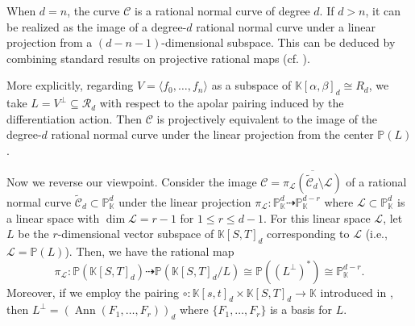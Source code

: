 \documentclass[a4paper, 11pt]{amsart}
\numberwithin{theorem}{section}
\theoremstyle{definition}
\numberwithin{equation}{section}
\DeclareMathOperator{\Ann}{\operatorname{Ann}}
\begin{document}
When $d = n$, the curve $\mathcal{C}$ is a rational normal curve of degree $d$. 
If $d > n$, it can be realized as the image of a degree-$d$ rational normal curve under a linear projection from a $(d-n-1)$-dimensional subspace. 
This can be deduced by combining standard results on projective rational maps (cf. \cite[Section 2]{MR3592466}).

More explicitly, regarding $V=\langle f_0,\dots,f_n\rangle$ as a subspace of $\mathbb{K}[\alpha,\beta]_d\cong R_d$, we take $L=V^\perp\subseteq\mathcal{R}_d$ with respect to the apolar pairing induced by the differentiation action.
Then $\mathcal{C}$ is projectively equivalent to the image of the degree-$d$ rational normal curve under the linear projection from the center $\mathbb{P}(L)$.

Now we reverse our viewpoint. 
Consider the image $\mathcal{C} = \overline{\pi_{\mathcal{L}}(\widetilde{\mathcal{C}}_d \setminus \mathcal{L})}$ of a rational normal curve $\widetilde{\mathcal{C}}_d \subset \mathbb{P}_{\mathbb{K}}^d$ under the linear projection $\pi_{\mathcal{L}} : \mathbb{P}_{\mathbb{K}}^d \dashrightarrow \mathbb{P}_{\mathbb{K}}^{d-r}$ where $\mathcal{L} \subset \mathbb{P}_{\mathbb{K}}^d$ is a linear space with $\dim \mathcal{L} = r-1$ for $1\leq r \leq d-1$. 
For this linear space $\mathcal{L}$, let $L$ be the $r$-dimensional vector subspace of $\mathbb{K}[S,T]_d$ corresponding to $\mathcal{L}$ (i.e., $\mathcal{L} = \mathbb{P}(L)$). 
Then, we have the rational map
\[
\pi_{\mathcal{L}} : \mathbb{P}(\mathbb{K}[S,T]_d) \dashrightarrow \mathbb{P}(\mathbb{K}[S,T]_d / L) \cong \mathbb{P}((L^\perp)^*) \cong \mathbb{P}_{\mathbb{K}}^{d-r}.
\]
Moreover, if we employ the pairing $\circ: \mathbb{K}[s,t]_d \times \mathbb{K}[S,T]_d \rightarrow \mathbb{K}$ introduced in , then $L^\perp = (\Ann(F_1,\dots,F_r))_d$ where $\{F_1, \dots, F_r\}$ is a basis for $L$.
\end{document}
